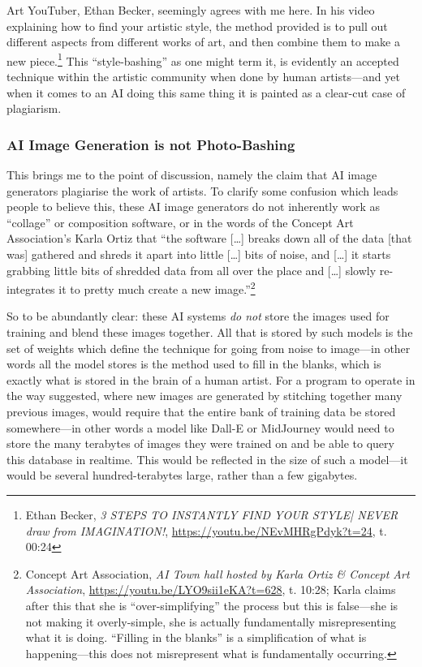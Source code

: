 \documentclass[11pt]{article}
\begin{document}
Art YouTuber, Ethan Becker, seemingly agrees with me here. In his video explaining how to find your artistic style, the method provided is to pull out different aspects from different works of art, and then combine them to make a new piece.\footnote{Ethan Becker, \emph{3 STEPS TO INSTANTLY FIND YOUR STYLE| NEVER draw from IMAGINATION!}, \url{https://youtu.be/NEvMHRgPdyk?t=24}, t. 00:24} This ``style-bashing'' as one might term it, is evidently an accepted technique within the artistic community when done by human artists---and yet when it comes to an AI doing this same thing it is painted as a clear-cut case of plagiarism.

\subsubsection*{AI Image Generation is not Photo-Bashing}
\label{sec:org3cf7d30}
This brings me to the point of discussion, namely the claim that AI image generators plagiarise the work of artists. To clarify some confusion which leads people to believe this, these AI image generators do not inherently work as ``collage'' or composition software, or in the words of the Concept Art Association's Karla Ortiz that ``the software [\ldots{}] breaks down all of the data [that was] gathered and shreds it apart into little [\ldots{}] bits of noise, and [\ldots{}] it starts grabbing little bits of shredded data from all over the place and [\ldots{}] slowly re-integrates it to pretty much create a new image.''\footnote{Concept Art Association, \emph{AI Town hall hosted by Karla Ortiz \& Concept Art Association}, \url{https://youtu.be/LYO9sii1eKA?t=628}, t. 10:28; Karla claims after this that she is ``over-simplifying'' the process but this is false---she is not making it overly-simple, she is actually fundamentally misrepresenting what it is doing. ``Filling in the blanks'' is a simplification of what is happening---this does not misrepresent what is fundamentally occurring.}

So to be abundantly clear: these AI systems \emph{do not} store the images used for training and blend these images together. All that is stored by such models is the set of weights which define the technique for going from noise to image---in other words all the model stores is the method used to fill in the blanks, which is exactly what is stored in the brain of a human artist. For a program to operate in the way suggested, where new images are generated by stitching together many previous images, would require that the entire bank of training data be stored somewhere---in other words a model like Dall-E or MidJourney would need to store the many terabytes of images they were trained on and be able to query this database in realtime. This would be reflected in the size of such a model---it would be several hundred-terabytes large, rather than a few gigabytes.
\end{document}
